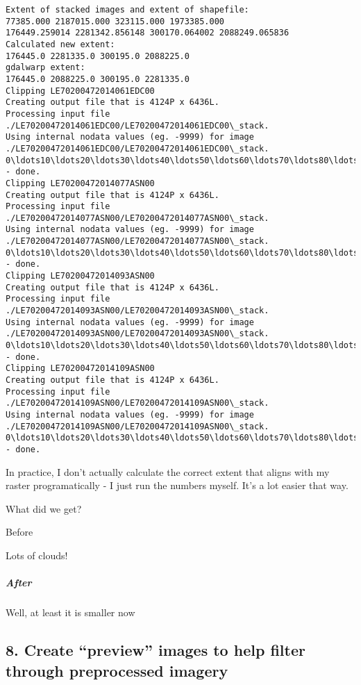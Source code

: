 \documentclass{article}
\begin{document}
    \begin{Verbatim}[commandchars=\\\{\}]
Extent of stacked images and extent of shapefile:
77385.000 2187015.000 323115.000 1973385.000
176449.259014 2281342.856148 300170.064002 2088249.065836
Calculated new extent:
176445.0 2281335.0 300195.0 2088225.0
gdalwarp extent:
176445.0 2088225.0 300195.0 2281335.0
Clipping LE70200472014061EDC00
Creating output file that is 4124P x 6436L.
Processing input file ./LE70200472014061EDC00/LE70200472014061EDC00\_stack.
Using internal nodata values (eg. -9999) for image ./LE70200472014061EDC00/LE70200472014061EDC00\_stack.
0\ldots10\ldots20\ldots30\ldots40\ldots50\ldots60\ldots70\ldots80\ldots90\ldots100 - done.
Clipping LE70200472014077ASN00
Creating output file that is 4124P x 6436L.
Processing input file ./LE70200472014077ASN00/LE70200472014077ASN00\_stack.
Using internal nodata values (eg. -9999) for image ./LE70200472014077ASN00/LE70200472014077ASN00\_stack.
0\ldots10\ldots20\ldots30\ldots40\ldots50\ldots60\ldots70\ldots80\ldots90\ldots100 - done.
Clipping LE70200472014093ASN00
Creating output file that is 4124P x 6436L.
Processing input file ./LE70200472014093ASN00/LE70200472014093ASN00\_stack.
Using internal nodata values (eg. -9999) for image ./LE70200472014093ASN00/LE70200472014093ASN00\_stack.
0\ldots10\ldots20\ldots30\ldots40\ldots50\ldots60\ldots70\ldots80\ldots90\ldots100 - done.
Clipping LE70200472014109ASN00
Creating output file that is 4124P x 6436L.
Processing input file ./LE70200472014109ASN00/LE70200472014109ASN00\_stack.
Using internal nodata values (eg. -9999) for image ./LE70200472014109ASN00/LE70200472014109ASN00\_stack.
0\ldots10\ldots20\ldots30\ldots40\ldots50\ldots60\ldots70\ldots80\ldots90\ldots100 - done.
    \end{Verbatim}

    In practice, I don't actually calculate the correct extent that aligns
with my raster programatically - I just run the numbers myself. It's a
lot easier that way.

What did we get?

Before

Lots of clouds!

\subparagraph{After}\label{after}

Well, at least it is smaller now

    \subsection{8. Create ``preview'' images to help filter through
preprocessed
imagery}\label{create-preview-images-to-help-filter-through-preprocessed-imagery}
\end{document}
